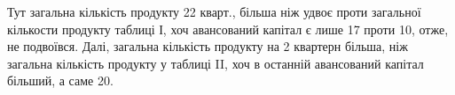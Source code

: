 \noindent{}Тут загальна кількість продукту \deq{} 22 кварт., більша ніж удвоє проти
загальної кількости продукту таблиці І, хоч авансований капітал є лише 17 проти 10, отже, не подвоївся. Далі, загальна кількість продукту
на 2 квартерн більша, ніж загальна кількість продукту у таблиці II, хоч
в останній авансований капітал більший, а саме 20.

